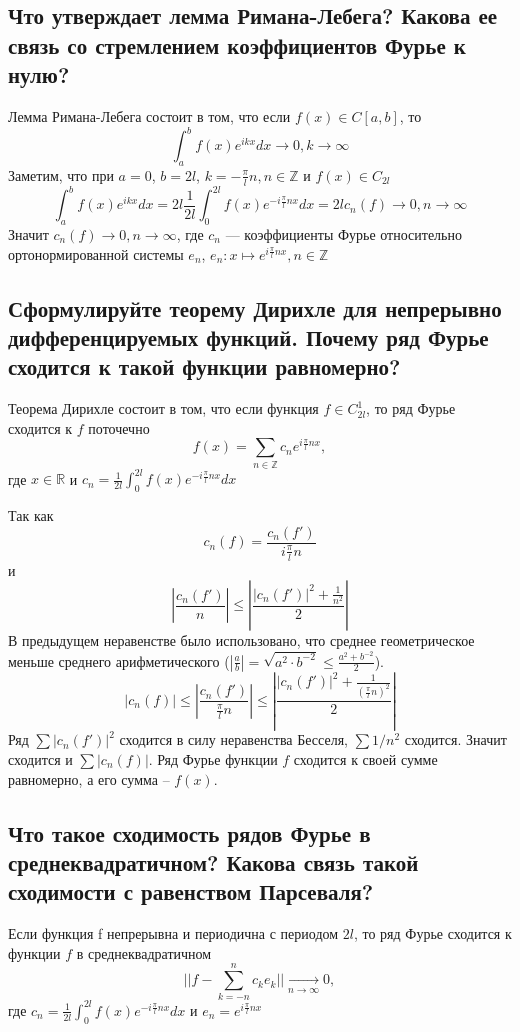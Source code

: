 \documentclass{article}
\begin{document}
\subsection{Что утверждает лемма Римана-Лебега? Какова ее связь со стремлением коэффициентов Фурье к нулю?}

Лемма Римана-Лебега состоит в том, что если $f(x)\in C[a,b]$, то
\[\int_a^b f(x)e^{ikx}dx \rightarrow 0, k \rightarrow \infty\]
Заметим, что при $a = 0$, $b = 2l$, $k=-\frac{\pi}{l}n, n \in \mathbb{Z}$ и $f(x)\in C_{2l}$ 
\[\int_a^b f(x)e^{ikx}dx = 2l \frac{1}{2l}\int_0^{2l}f(x)e^{-i\frac{\pi}{l}nx}dx = 2lc_n(f) \rightarrow 0, n \rightarrow  \infty\]
Значит $c_n(f) \rightarrow 0, n \rightarrow  \infty$, 
где $c_n$ --- коэффициенты Фурье относительно ортонормированной системы ${e_n}$, $e_n: x \mapsto e^{i\frac{\pi}{l}nx}, n \in \mathbb{Z}$



\subsection{Сформулируйте теорему Дирихле для непрерывно дифференцируемых функций. Почему ряд Фурье сходится к такой функции равномерно?}
Теорема Дирихле состоит в том, что если функция $f \in C_{2l}^1$, то ряд Фурье сходится к $f$ поточечно
\[f(x)=\sum_{n \in \mathbb{Z}} c_n e^{i\frac{\pi}{l}nx}, \]
где $x \in \mathbb{R}$ и $c_n = \frac{1}{2l}\int_0^{2l}f(x)e^{-i\frac{\pi}{l}nx}dx$

Так как
\[ c_n(f) = \frac{c_n(f')}{i\frac{\pi}{l}n} \]
и \[ \left| \frac{c_n(f')}{n} \right| \leq \left|\frac{|c_n(f')|^2 + \frac{1}{n^2}}{2}\right|\]
В предыдущем неравенстве было использовано, что среднее геометрическое меньше среднего арифметического 
($ \left| \frac{a}{b} \right| = \sqrt{a^2 \cdot b^{-2}} \leq \frac{a^2+b^{-2}}{2}  $).
\[ |c_n(f)| \leq \left| \frac{c_n(f')}{\frac{\pi}{l}n} \right| \leq \left|\frac{|c_n(f')|^2 + \frac{1}{(\frac{\pi}{l}n)^2}}{2}\right|\] 
Ряд $\sum |c_n(f')|^2$ сходится в силу неравенства Бесселя, $\sum 1/n^2$ сходится. Значит сходится и $\sum |c_n(f)|$. 
Ряд Фурье функции $f$ сходится к своей сумме равномерно, а его сумма -- $f(x)$. 



\subsection{Что такое сходимость рядов Фурье в среднеквадратичном? Какова связь такой сходимости с равенством Парсеваля?}
Если функция f непрерывна и периодична с периодом $ 2l $, то ряд Фурье сходится к функции $ f $ в среднеквадратичном
\[ ||f-\sum_{k=-n}^{n} c_k e_k|| \underset{n \rightarrow \infty}{\longrightarrow} 0 ,\] 
где $c_n = \frac{1}{2l}\int_0^{2l}f(x)e^{-i\frac{\pi}{l}nx}dx$ и $e_n = e^{i\frac{\pi}{l}nx}$
\end{document}
